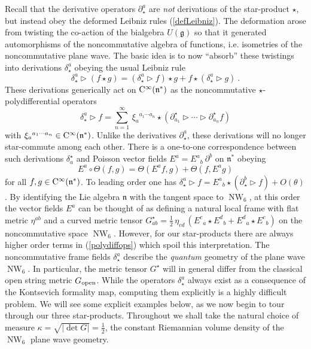 \documentclass[11pt,a4paper]{article}
\DeclareMathOperator{\NW}{NW}
\newcommand{\1}{\mathbb{1}}
\def\CC{{\rm C}}
\def\mfn{{\mathfrak n}}
\def\mfg{{\mathfrak g}}
\begin{document}
Recall that the derivative operators $\partial_\star^{a}$ are {\it
  not} derivations of the star-product $\star$, but instead obey the
deformed Leibniz rules (\ref{defLeibniz}). The deformation arose from
twisting the co-action of the bialgebra $U(\mfg)$ so that it generated
automorphisms of the noncommutative algebra of functions,
i.e. isometries of the noncommutative plane wave. The basic idea is to
now ``absorb'' these twistings into derivations $\delta_\star^a$
obeying the usual Leibniz rule
\begin{equation}
\delta_\star^a\triangleright(f\star g)=\left(\delta_\star^a
\triangleright f\right)\star g+f\star\left(\delta_\star^a
\triangleright g\right) \ .
\label{deltaLeibniz}\end{equation}
These derivations generically act on $\CC^\infty(\mfn^*)$ as the
noncommutative $\star$-polydifferential operators
\begin{equation}
\delta_\star^a\triangleright f=\sum_{n=1}^\infty\,\xi_a{}^{a_1\cdots
  a_n}\star\left(\partial_{a_1}^\star\triangleright\cdots\triangleright
\partial_{a_n}^\star f\right)
\label{polydiffops}\end{equation}
with $\xi_a{}^{a_1\cdots a_n}\in\CC^\infty(\mfn^*)$. Unlike the
derivatives $\partial_\star^a$, these derivations will no longer
star-commute among each other. There is a one-to-one correspondence
between such derivations $\delta_a^\star$ and Poisson vector fields
$E^a=E^a{}_b~\partial^b$ on $\mfn^*$ obeying
\begin{equation}
E^a\circ\Theta(f,g)=\Theta(E^af,g)+\Theta(f,E^ag)
\label{Poissonvecfields}\end{equation}
for all $f,g\in\CC^\infty(\mfn^*)$. To leading order one has
$\delta_\star^a\triangleright
f=E^a{}_b\star(\partial_\star^b\triangleright f)+O(\theta)$. By
identifying the Lie algebra $\mfn$ with the tangent space to $\NW_6$,
at this order the vector fields $E^a$ can be thought of as defining a
natural local frame with flat metric $\eta^{ab}$ and a curved metric tensor
$G^\star_{ab}=\frac12\,\eta_{cd}\,(E^c{}_a\star E^d{}_b+E^d{}_a\star
E^c{}_b)$ on the noncommutative space $\NW_6$. However, for our
star-products there are always higher order terms in
(\ref{polydiffops}) which spoil this interpretation. The
noncommutative frame fields $\delta_\star^a$ describe the {\it
  quantum} geometry of the plane wave $\NW_6$. In particular, the
metric tensor $G^\star$ will in general differ from the
classical open string metric $G_{\rm open}$. While the operators
$\delta_\star^a$ always exist as a consequence of the Kontsevich
formality map, computing them explicitly is a highly difficult
problem. We will see some explicit examples below, as we now begin to
tour through our three star-products. Throughout we shall take the
natural choice of measure $\kappa=\sqrt{|\det G|}=\frac12$, the
constant Riemannian volume density of the $\NW_6$ plane wave
geometry.
\end{document}

